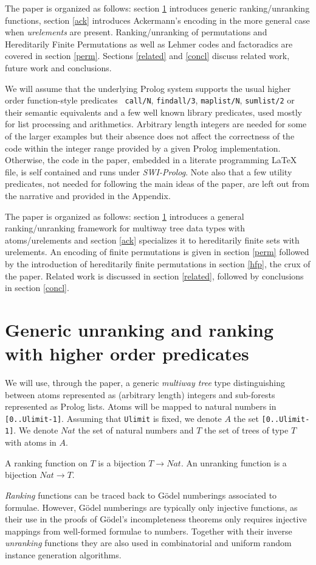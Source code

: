 \documentclass[]{INCLUDES/llncs}
\begin{document}
The paper is organized
as follows: section \ref{unrank} introduces generic 
ranking/unranking functions, section \ref{ack} introduces
 Ackermann's encoding in the more general case 
when {\em urelements} are present.
Ranking/unranking of permutations and Hereditarily Finite
Permutations as well as Lehmer codes and factoradics are covered in 
section \ref{perm}. Sections \ref{related} and \ref{concl}
discuss related work, future work and conclusions.
 
We will assume that the underlying
Prolog system supports the usual higher order 
function-style predicates {\tt
call/N}, {\tt findall/3}, {\tt maplist/N}, {\tt sumlist/2} or 
their semantic equivalents 
and a few well known library predicates, used mostly for list processing and
arithmetics. Arbitrary length integers are needed for 
some of the larger examples but 
their absence does not affect the correctness of
the code within the integer range provided by a given Prolog implementation.
Otherwise, the code in the paper, embedded in a literate programming LaTeX
file, is self contained and runs under {\em SWI-Prolog}. Note also that a few
utility predicates, not needed for following the main ideas of the paper,
are left out from the narrative and provided in the Appendix.

The paper is organized as follows: section \ref{unrank} introduces a general
ranking/unranking framework for multiway tree data types with atoms/urelements
and section \ref{ack} specializes it to hereditarily finite sets with
urelements. An encoding of finite permutations is given in section \ref{perm}
followed by the introduction of hereditarily finite permutations in section
\ref{hfp}, the crux of the paper.
Related work is discussed in section \ref{related}, followed by conclusions in
section \ref{concl}.

\section{Generic unranking and ranking with higher order predicates}
\label{unrank}
We will use, through the paper, a generic {\em multiway tree} type
distinguishing between atoms represented as (arbitrary length) integers and
sub-forests represented as Prolog lists.
Atoms will be
mapped to natural numbers in {\tt [0..Ulimit-1]}. 
Assuming that {\tt Ulimit} is fixed, we denote $A$ the set {\tt [0..Ulimit-1]}.
We denote $Nat$ the set of natural numbers and $T$ 
the set of trees of type $T$ with atoms in $A$.
\begin{df}
A ranking function on $T$ is a bijection $T \rightarrow Nat$.
An unranking function is a bijection $Nat \rightarrow T$.
\end{df}
{\em Ranking} functions can be traced back to 
G\"{o}del numberings \cite{Goedel:31,conf/icalp/HartmanisB74} 
associated to formulae. However, G\"{o}del numberings are typically only
injective functions, as their use in the proofs of G\"{o}del's incompleteness
theorems only requires injective mappings from well-formed formulae to
numbers. Together with their inverse {\em unranking} functions
they are also used in combinatorial and uniform random instance generation
\cite{conf/mfcs/MartinezM03,knuth06draft} algorithms.
\end{document}
